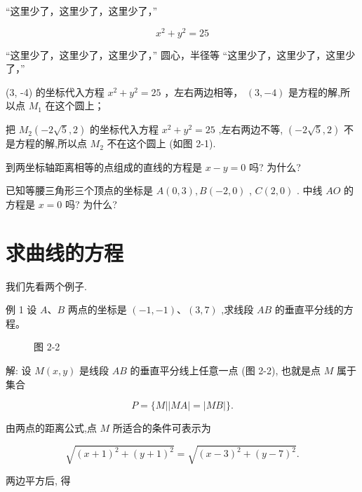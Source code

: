 \documentclass[lang=cn,newtx,12pt,scheme=chinese]{elegantbook}
\begin{document}
“这里少了，这里少了，这里少了，”

\[
    {x}^{2} + {y}^{2} = {25}
\]

“这里少了，这里少了，这里少了，” 圆心，半径等 “这里少了，这里少了，这里少了，” 

(3, -4) 的坐标代入方程 \({x}^{2} + {y}^{2} = {25}\) ，左右两边相等， \(\left( {3, - 4}\right)\) 是方程的解,所以点 \({M}_{1}\) 在这个圆上；

把 \({M}_{2}\left( {-2\sqrt{5},2}\right)\) 的坐标代入方程 \({x}^{2} + {y}^{2} = {25}\) ,左右两边不等, \(\left( {-2\sqrt{5},2}\right)\) 不是方程的解,所以点 \({M}_{2}\) 不在这个圆上 (如图 2-1).

\begin{problemset}[练习]

\item 到两坐标轴距离相等的点组成的直线的方程是 \(x - y = 0\) 吗? 为什么?

\item 已知等腰三角形三个顶点的坐标是 \(A\left( {0,3}\right) ,B\left( {-2,0}\right)\) , \(C\left( {2,0}\right)\) . 中线 \({AO}\) 的方程是 \(x = 0\) 吗? 为什么?

\end{problemset}

\section{求曲线的方程}

我们先看两个例子.

例 1 设 \(A\text{、}B\) 两点的坐标是 \(\left( {-1, - 1}\right) \text{、}\left( {3,7}\right)\) ,求线段 \({AB}\) 的垂直平分线的方程。

\begin{figure}[h]
  \centering
  
  \caption{图 2-2}
\end{figure}

解: 设 \(M\left( {x,y}\right)\) 是线段 \({AB}\) 的垂直平分线上任意一点 (图 2-2), 也就是点 \(M\) 属于集合

\[
  P = \{ M\left| \right| {MA}\left| = \right| {MB} \mid \} .
\]

由两点的距离公式,点 \(M\) 所适合的条件可表示为

\[
  \sqrt{{\left( x + 1\right) }^{2} + {\left( y + 1\right) }^{2}} = \sqrt{{\left( x - 3\right) }^{2} + {\left( y - 7\right) }^{2}}.
\]

两边平方后, 得
\end{document}
